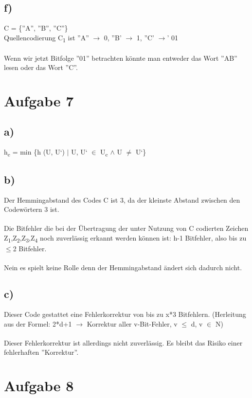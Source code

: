 \documentclass[a4paper,12pt]{scrartcl}
\begin{document}
\subsection{f)}
C = \{''A'', ''B'', ''C''\}\\
Quellencodierung C\textsubscript{1} ist ''A'' $\rightarrow$ 0, ''B' $\rightarrow$ 1, ''C' $\rightarrow$' 01\\\\
Wenn wir jetzt Bitfolge ''01'' betrachten könnte man entweder das Wort ''AB'' lesen oder das Wort ''C''.

\section{Aufgabe 7}
\subsection{a)}
h\textsubscript{c} = min \{h (U, U‘) $\vert$ U, U‘ $\in$ U\textsubscript{c} $\wedge$ U $\not=$ U‘\}

\subsection{b)}
Der Hemmingabstand des Codes C ist 3, da der kleinste Abstand zwischen den Codewörtern 3 ist. \\\\
Die Bitfehler die bei der Übertragung der unter Nutzung von C codierten Zeichen Z\textsubscript{1},Z\textsubscript{2},Z\textsubscript{3},Z\textsubscript{4} noch zuverlässig erkannt werden können ist: h-1 Bitfehler, also bis zu $\leq$2 Bitfehler.\\\\
Nein es spielt keine Rolle denn der Hemmingabstand ändert sich dadurch nicht.

\subsection{c)}
Dieser Code gestattet eine Fehlerkorrektur von bis zu x*3 Bitfehlern. (Herleitung aus der Formel: 2*d+1 $\rightarrow$ Korrektur aller v-Bit-Fehler, v $\leq$ d, v $\in$ N)\\\\
Dieser Fehlerkorrektur ist allerdings nicht zuverlässig. Es bleibt das Risiko einer fehlerhaften ''Korrektur''.

\section{Aufgabe 8}
\end{document}
